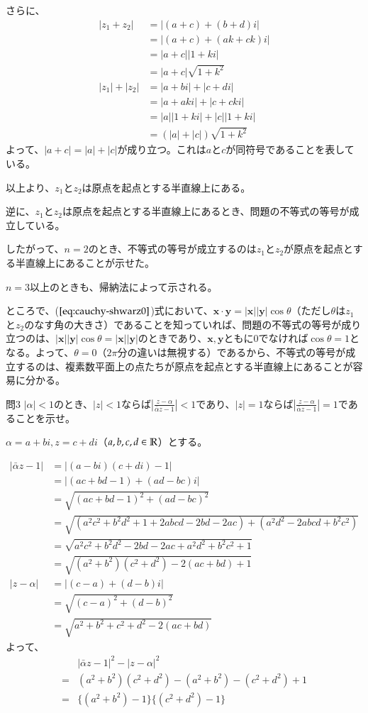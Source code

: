 さらに、
\begin{align*}
    |z_1+z_2|&=|(a+c)+(b+d)i|\\
    &=|(a+c)+(ak+ck)i|\\
    &=|a+c||1+ki|\\
    &=|a+c|\sqrt{1+k^2}\\
    |z_1|+|z_2|&=|a+bi|+|c+di|\\
    &=|a+aki|+|c+cki|\\
    &=|a||1+ki|+|c||1+ki|\\
    &=(|a|+|c|)\sqrt{1+k^2}
\end{align*}
よって、$|a+c|=|a|+|c|$が成り立つ。これは$a$と$c$が同符号であることを表している。

以上より、$z_1$と$z_2$は原点を起点とする半直線上にある。

逆に、$z_1$と$z_2$は原点を起点とする半直線上にあるとき、問題の不等式の等号が成立している。

したがって、$n=2$のとき、不等式の等号が成立するのは$z_1$と$z_2$が原点を起点とする半直線上にあることが示せた。

$n=3$以上のときも、帰納法によって示される。

ところで、($\ref{eq:cauchy-shwarz0}$)式において、$\bm{x}\cdot \bm{y}=|\bm{x}||\bm{y}|\cos \theta$（ただし$\theta$は$z_1$と$z_2$のなす角の大きさ）であることを知っていれば、問題の不等式の等号が成り立つのは、$|\bm{x}||\bm{y}|\cos \theta=|\bm{x}||\bm{y}|$のときであり、$\bm{x}, \bm{y}$ともに0でなければ$\cos \theta=1$となる。よって、$\theta=0$（$2\pi$分の違いは無視する）であるから、不等式の等号が成立するのは、複素数平面上の点たちが原点を起点とする半直線上にあることが容易に分かる。

\begin{mysimplebox}{問3}
    $|\alpha|<1$のとき、$|z|<1$ならば$\left|\frac{z-\alpha}{\bar{\alpha}z-1}\right|<1$であり、$|z|=1$ならば$\left|\frac{z-\alpha}{\bar{\alpha}z-1}\right|=1$であることを示せ。
\end{mysimplebox}

$\alpha=a+bi, z=c+di$（$a,b,c,d\in\mathbb{R}$）とする。

\begin{align*}
    |\bar{\alpha}z-1|&=|(a-bi)(c+di)-1|\\
    &=|(ac+bd-1)+(ad-bc)i|\\
    &=\sqrt{(ac+bd-1)^2+(ad-bc)^2}\\
    &=\sqrt{(a^2c^2+b^2d^2+1+2abcd-2bd-2ac)+(a^2d^2-2abcd+b^2c^2)}\\
    &=\sqrt{a^2c^2+b^2d^2-2bd-2ac+a^2d^2+b^2c^2+1}\\
    &=\sqrt{(a^2+b^2)(c^2+d^2)-2(ac+bd)+1}\\
    |z-\alpha|&=|(c-a)+(d-b)i|\\
    &=\sqrt{(c-a)^2+(d-b)^2}\\
    &=\sqrt{a^2+b^2+c^2+d^2-2(ac+bd)}
\end{align*}
よって、
\begin{align*}
    &|\bar{\alpha}z-1|^2-|z-\alpha|^2\\
    =&(a^2+b^2)(c^2+d^2)-(a^2+b^2)-(c^2+d^2)+1\\
    =&\{(a^2+b^2)-1\}\{(c^2+d^2)-1\}
\end{align*}

